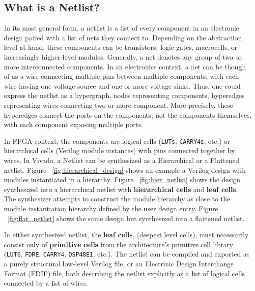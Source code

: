 \subsection{What is a Netlist?}
\label{subsec:netlist}
In its most general form, a netlist is a list of every component in an electronic design paired with a list of nets they connect to. 
Depending on the abstraction level at hand, these components can be transistors, logic gates, macrocells, or increasingly higher-level modules. 
Generally, a net denotes any group of two or more interconnected components.
In an electronics context, a net can be though of as a wire connecting multiple pins between multiple components, with each wire having one voltage source and one or more voltage sinks. 
Thus, one could express the netlist as a hypergraph, nodes representing components, hyperedges representing wires connecting two or more component. 
More precisely, these hyperedges connect the ports on the components, not the components themselves, with each component exposing multiple ports. 

In FPGA context, the components are logical cells (\texttt{LUTs}, \texttt{CARRY4s}, etc.) or hierarchical cells (Verilog module instances) with pins connected together by wires. 
In Vivado, a Netlist can be synthesized as a Hierarchical or a Flattened netlist. 
Figure ~\ref{fig:hierarchical_design} shows an example a Verilog design with modules instantiated in a hierarchy. 
Figure ~\ref{fig:hier_netlist} shows the design synthesized into a hierarchical netlist with \textbf{hierarchical cells} and \textbf{leaf cells}. 
The synthesizer attempts to construct the module hierarchy as close to the module instantiation hierarchy defined by the user design entry. 
Figure ~\ref{fig:flat_netlist} shows the same design but synthesized into a flattened netlist. 

In either synthesized netlist, the \textbf{leaf cells}, (deepest level cells), must necessarily consist only of \textbf{primitive cells} from the architecture's primitive cell library (\texttt{LUT6}, \texttt{FDRE}, \texttt{CARRY4}, \texttt{DSP48E1}, etc.). 
The netlist can be compiled and exported as a purely structural low-level Verilog file, or an Electrinic Design Interchange Format (EDIF) file, both describing the netlist explicitly as a list of logical cells connected by a list of wires. 

